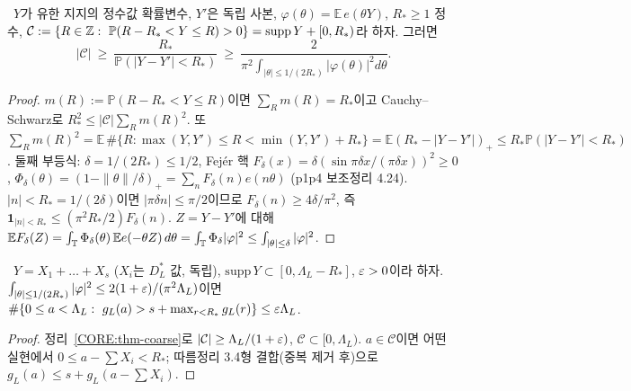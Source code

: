 \begin{theorem}\label{CORE:thm-coarse}
\PROVED\ $Y$가 유한 지지의 정수값 확률변수, $Y'$은 독립 사본, $\varphi(\theta)=\mathbb E\,e(\theta Y)$, $R_*\ge1$ 정수, $\mathcal C:=\{R\in\mathbb{Z}:\ \mathbb P(R-R_*<Y\le R)>0\}=\mathrm{supp}\,Y+[0,R_*)$라 하자. 그러면
\[
|\mathcal C|\ \ge\ \frac{R_*}{\mathbb P(|Y-Y'|<R_*)}\ \ge\ \frac{2}{\pi^2\int_{|\theta|\le1/(2R_*)}|\varphi(\theta)|^2d\theta}.
\]
\end{theorem}
\begin{proof}
$m(R):=\mathbb P(R-R_*<Y\le R)$이면 $\sum_Rm(R)=R_*$이고 Cauchy–Schwarz로 $R_*^2\le|\mathcal C|\sum_Rm(R)^2$. 또
$\sum_Rm(R)^2=\mathbb E\,\#\{R:\max(Y,Y')\le R<\min(Y,Y')+R_*\}=\mathbb E(R_*-|Y-Y'|)_+\le R_*\mathbb P(|Y-Y'|<R_*)$. 둘째 부등식: $\delta=1/(2R_*)\le1/2$, Fejér 핵 $F_\delta(x)=\delta(\sin\pi\delta x/(\pi\delta x))^2\ge0$, $\Phi_\delta(\theta)=(1-\|\theta\|/\delta)_+=\sum_nF_\delta(n)e(n\theta)$ (p1p4 보조정리 4.24). $|n|<R_*=1/(2\delta)$이면 $|\pi\delta n|\le\pi/2$이므로 $F_\delta(n)\ge4\delta/\pi^2$, 즉 $\mathbf 1_{|n|<R_*}\le(\pi^2R_*/2)F_\delta(n)$. $Z=Y-Y'$에 대해 $\mathbb EF_\delta(Z)=\int_{\mathbb{T}}\Phi_\delta(\theta)\,\mathbb Ee(-\theta Z)\,d\theta=\int_{\mathbb{T}}\Phi_\delta|\varphi|^2\le\int_{|\theta|\le\delta}|\varphi|^2$.
\end{proof}

\begin{corollary}\label{CORE:cor-almostall}
\PROVED\ $Y=X_1+\dots+X_s$ ($X_i$는 $D^*_L$ 값, 독립), $\mathrm{supp}\,Y\subset[0,\Lambda_L-R_*]$, $\varepsilon>0$이라 하자. $\int_{|\theta|\le1/(2R_*)}|\varphi|^2\le2(1+\varepsilon)/(\pi^2\Lambda_L)$이면 $\#\{0\le a<\Lambda_L:\ g_L(a)>s+\max_{r<R_*}g_L(r)\}\le\eps\Lambda_L$.
\end{corollary}
\begin{proof}
정리~\ref{CORE:thm-coarse}로 $|\mathcal C|\ge\Lambda_L/(1+\varepsilon)$, $\mathcal C\subset[0,\Lambda_L)$. $a\in\mathcal C$이면 어떤 실현에서 $0\le a-\sum X_i<R_*$; 따름정리 3.4형 결합(중복 제거 후)으로 $g_L(a)\le s+g_L(a-\sum X_i)$.
\end{proof}

